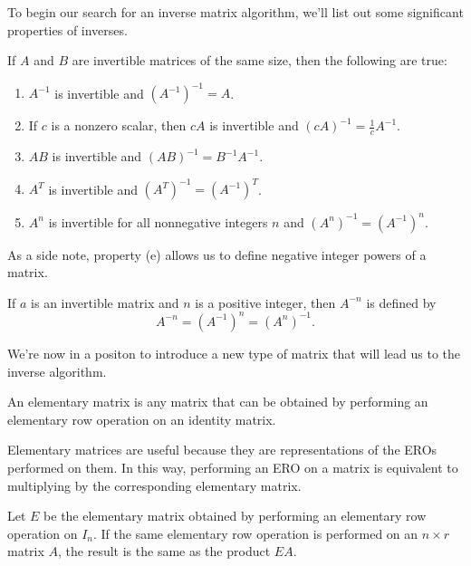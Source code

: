 \documentclass[../m73main.tex]{subfiles}
\begin{document}
To begin our search for an inverse matrix algorithm, we'll list out some significant properties of inverses.

\begin{theorem}
	If $A$ and $B$ are invertible matrices of the same size, then the following are true:
	\begin{enumerate}[label=(\alph*)]
		\item $A^{-1}$ is invertible and $(A^{-1})^{-1} = A$.
		\item If $c$ is a nonzero scalar, then $cA$ is invertible and $(cA)^{-1} = \frac{1}{c}A^{-1}$.
		\item $AB$ is invertible and $(AB)^{-1} = B^{-1}A^{-1}$.
		\item $A^T$ is invertible and $(A^T)^{-1} = (A^{-1})^T$.
		\item $A^n$ is invertible for all nonnegative integers $n$ and $(A^n)^{-1} = (A^{-1})^n$.
	\end{enumerate}
\end{theorem}

As a side note, property (e) allows us to define negative integer powers of a matrix.

\begin{definition}
	If $a$ is an invertible matrix and $n$ is a positive integer, then $A^{-n}$ is defined by
	\[ A^{-n} = (A^{-1})^n = (A^n)^{-1}. \]
\end{definition}

We're now in a positon to introduce a new type of matrix that will lead us to the inverse algorithm.

\begin{definition}
	An elementary matrix is any matrix that can be obtained by performing an elementary row operation on an identity matrix.
\end{definition}

Elementary matrices are useful because they are representations of the EROs performed on them.
In this way, performing an ERO on a matrix is equivalent to multiplying by the corresponding elementary matrix.

\begin{theorem}
	Let $E$ be the elementary matrix obtained by performing an elementary row operation on $I_n$.
	If the same elementary row operation is performed on an $n\times r$ matrix $A$, the result is the same as the product $EA$.
\end{theorem}
\end{document}
